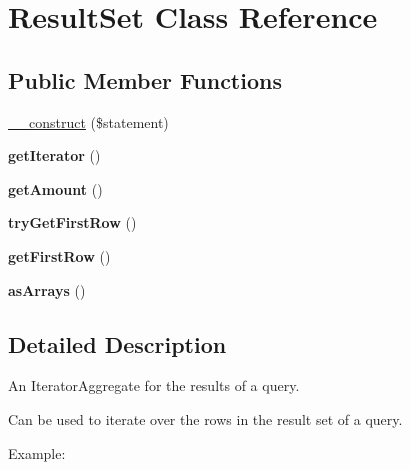 \hypertarget{classResultSet}{
\section{ResultSet Class Reference}
\label{classResultSet}
}
\subsection*{Public Member Functions}
\begin{DoxyCompactItemize}
\item 
\hyperlink{classResultSet_ac86b486df597ae5b9e54149da234914f}{\_\-\_\-construct} (\$statement)
\item 
\hypertarget{classResultSet_a8eb3574cf0f0176005f873c4f85d18d1}{
{\bfseries getIterator} ()}
\label{classResultSet_a8eb3574cf0f0176005f873c4f85d18d1}

\item 
\hypertarget{classResultSet_a5f84a517e8af2bdd202b663f7e63a943}{
{\bfseries getAmount} ()}
\label{classResultSet_a5f84a517e8af2bdd202b663f7e63a943}

\item 
\hypertarget{classResultSet_ab677b0700c7706b6be5d01c9aa733140}{
{\bfseries tryGetFirstRow} ()}
\label{classResultSet_ab677b0700c7706b6be5d01c9aa733140}

\item 
\hypertarget{classResultSet_af7f034541c0d410bd2def9925074a993}{
{\bfseries getFirstRow} ()}
\label{classResultSet_af7f034541c0d410bd2def9925074a993}

\item 
\hypertarget{classResultSet_aedc1f5a1d07f1a027eeceb1ff4c02225}{
{\bfseries asArrays} ()}
\label{classResultSet_aedc1f5a1d07f1a027eeceb1ff4c02225}

\end{DoxyCompactItemize}


\subsection{Detailed Description}
An IteratorAggregate for the results of a query.

Can be used to iterate over the rows in the result set of a query.

Example: 
 

